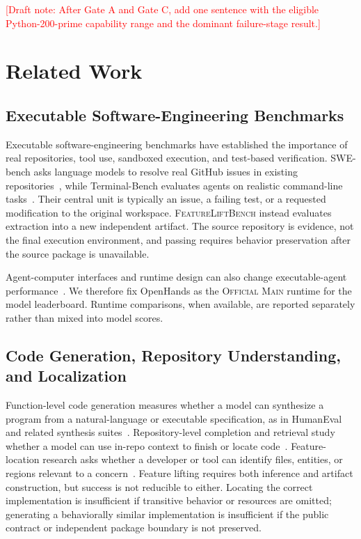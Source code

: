 \documentclass[acmsmall,anonymous,review,screen]{acmart}
\newcommand{\flb}{\textsc{FeatureLiftBench}\xspace}
\newcommand{\mainprotocol}{\textsc{Official Main}\xspace}
\newcommand{\draftnote}[1]{\textcolor{red}{[Draft note: #1]}}
\begin{document}
\draftnote{After Gate A and Gate C, add one sentence with the eligible
Python-200-prime capability range and the dominant failure-stage result.}


\section{Related Work}
\label{sec:related-work}

\subsection{Executable Software-Engineering Benchmarks}

Executable software-engineering benchmarks have established the importance of
real repositories, tool use, sandboxed execution, and test-based verification.
SWE-bench asks language models to resolve real GitHub issues in existing
repositories~\cite{jimenez2024swebench}, while Terminal-Bench evaluates agents
on realistic command-line tasks~\cite{merrill2026terminalbench}. Their central
unit is typically an issue, a failing test, or a requested modification to the
original workspace. \flb instead evaluates extraction into a new independent
artifact. The source repository is evidence, not the final execution
environment, and passing requires behavior preservation after the source
package is unavailable.

Agent-computer interfaces and runtime design can also change executable-agent
performance~\cite{yang2024sweagent,yao2026harnessbench}. We therefore fix
OpenHands as the \mainprotocol runtime for the model leaderboard. Runtime
comparisons, when available, are reported separately rather than mixed into
model scores.

\subsection{Code Generation, Repository Understanding, and Localization}

Function-level code generation measures whether a model can synthesize a
program from a natural-language or executable specification, as in HumanEval
and related synthesis
suites~\cite{chen2021codex,austin2021mbpp,lai2023ds1000,zhuo2024bigcodebench,jain2024livecodebench}.
Repository-level completion and retrieval study whether a model can use
in-repo context to finish or locate code~\cite{zhang2023repocoder,liu2024repobench}.
Feature-location research asks whether a developer or tool can identify files,
entities, or regions relevant to a concern~\cite{dit2013featurelocation}.
Feature lifting requires both inference and artifact construction, but success
is not reducible to either. Locating the correct implementation is insufficient
if transitive behavior or resources are omitted; generating a behaviorally
similar implementation is insufficient if the public contract or independent
package boundary is not preserved.
\end{document}
